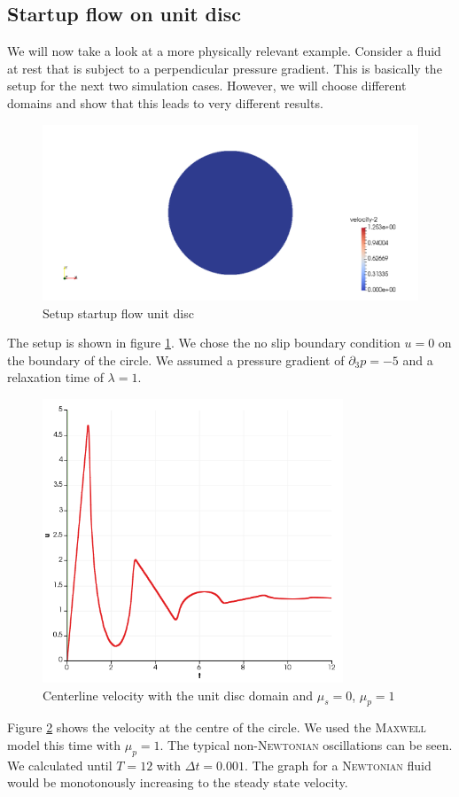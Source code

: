 \documentclass[12pt,a4paper,twoside, open=right]{scrreprt}
\theoremstyle{definition}
\theoremstyle{plain}
\begin{document}
\subsection{Startup flow on unit disc}
We will now take a look at a more physically relevant example. Consider a fluid at rest that is subject to a perpendicular pressure gradient. This is basically the setup for the next two simulation cases. However, we will choose different domains and show that this leads to very different results. 
\begin{figure}
    \centering
    \includegraphics[width=\textwidth]{UnitDiscSetup}
    \caption{Setup startup flow unit disc}
    \label{fig:unitdiscsetup}
\end{figure}
The setup is shown in figure \ref{fig:unitdiscsetup}. We chose the no slip boundary condition $u=0$ on the boundary of the circle. We assumed a pressure gradient of $\partial_3 p=-5$ and a relaxation time of $\lambda=1$. 
\begin{figure}
    \centering
    \includegraphics[width=0.8\textwidth]{UnitDiscCenterline}
    \caption{Centerline velocity with the unit disc domain and $\mu_s=0$, $\mu_p=1$}
    \label{fig:unitdisccenterline}
\end{figure}
Figure \ref{fig:unitdisccenterline} shows the velocity at the centre of the circle. We used the \textsc{Maxwell} model this time with $\mu_p=1$. The typical non-\textsc{Newtonian} oscillations can be seen. We calculated until $T=12$ with $\Delta t=0.001$. The graph for a \textsc{Newtonian} fluid would be monotonously increasing to the steady state velocity.
\end{document}
